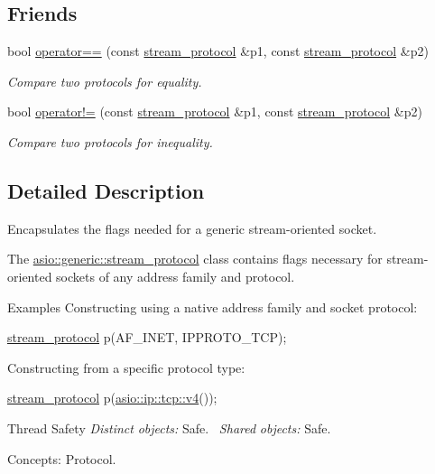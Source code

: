 \subsection*{Friends}
\begin{DoxyCompactItemize}
\item 
bool \hyperlink{classasio_1_1generic_1_1stream__protocol_a5c9769c22be0fefb71ff42caab837dba}{operator==} (const \hyperlink{classasio_1_1generic_1_1stream__protocol}{stream\+\_\+protocol} \&p1, const \hyperlink{classasio_1_1generic_1_1stream__protocol}{stream\+\_\+protocol} \&p2)
\begin{DoxyCompactList}\small\item\em Compare two protocols for equality. \end{DoxyCompactList}\item 
bool \hyperlink{classasio_1_1generic_1_1stream__protocol_af21c816bf9da77d206ca2c32498185d0}{operator!=} (const \hyperlink{classasio_1_1generic_1_1stream__protocol}{stream\+\_\+protocol} \&p1, const \hyperlink{classasio_1_1generic_1_1stream__protocol}{stream\+\_\+protocol} \&p2)
\begin{DoxyCompactList}\small\item\em Compare two protocols for inequality. \end{DoxyCompactList}\end{DoxyCompactItemize}


\subsection{Detailed Description}
Encapsulates the flags needed for a generic stream-\/oriented socket. 

The \hyperlink{classasio_1_1generic_1_1stream__protocol}{asio\+::generic\+::stream\+\_\+protocol} class contains flags necessary for stream-\/oriented sockets of any address family and protocol.

\begin{DoxyParagraph}{Examples}
Constructing using a native address family and socket protocol\+: 
\begin{DoxyCode}
\hyperlink{classasio_1_1generic_1_1stream__protocol_aadcf2d5a99b518a537d7ab6d618a217a}{stream\_protocol} p(AF\_INET, IPPROTO\_TCP); 
\end{DoxyCode}
 Constructing from a specific protocol type\+: 
\begin{DoxyCode}
\hyperlink{classasio_1_1generic_1_1stream__protocol_aadcf2d5a99b518a537d7ab6d618a217a}{stream\_protocol} p(\hyperlink{classasio_1_1ip_1_1tcp_a5123c64b44b4c5fd3c016ce75cbf096d}{asio::ip::tcp::v4}()); 
\end{DoxyCode}

\end{DoxyParagraph}
\begin{DoxyParagraph}{Thread Safety}
{\itshape Distinct} {\itshape objects\+:} Safe.~\newline
{\itshape Shared} {\itshape objects\+:} Safe.
\end{DoxyParagraph}
\begin{DoxyParagraph}{Concepts\+:}
Protocol. 
\end{DoxyParagraph}


